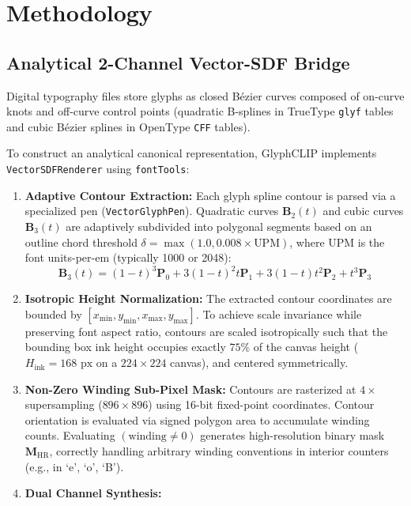 \documentclass[10pt,twocolumn,letterpaper]{article}
\begin{document}
\section{Methodology}

\subsection{Analytical 2-Channel Vector-SDF Bridge}
Digital typography files store glyphs as closed Bézier curves composed of on-curve knots and off-curve control points (quadratic B-splines in TrueType \texttt{glyf} tables and cubic Bézier splines in OpenType \texttt{CFF} tables).

To construct an analytical canonical representation, GlyphCLIP implements \texttt{VectorSDFRenderer} using \texttt{fontTools}:
\begin{enumerate}
    \item \textbf{Adaptive Contour Extraction:} Each glyph spline contour is parsed via a specialized pen (\texttt{VectorGlyphPen}). Quadratic curves $\mathbf{B}_2(t)$ and cubic curves $\mathbf{B}_3(t)$ are adaptively subdivided into polygonal segments based on an outline chord threshold $\delta = \max(1.0, 0.008 \times \text{UPM})$, where $\text{UPM}$ is the font units-per-em (typically 1000 or 2048):
    \begin{equation}
        \mathbf{B}_3(t) = (1-t)^3 \mathbf{P}_0 + 3(1-t)^2 t \mathbf{P}_1 + 3(1-t)t^2 \mathbf{P}_2 + t^3 \mathbf{P}_3
    \end{equation}
    \item \textbf{Isotropic Height Normalization:} The extracted contour coordinates are bounded by $[x_{\min}, y_{\min}, x_{\max}, y_{\max}]$. To achieve scale invariance while preserving font aspect ratio, contours are scaled isotropically such that the bounding box ink height occupies exactly $75\%$ of the canvas height ($H_{\text{ink}} = 168\text{ px}$ on a $224 \times 224$ canvas), and centered symmetrically.
    \item \textbf{Non-Zero Winding Sub-Pixel Mask:} Contours are rasterized at $4\times$ supersampling ($896 \times 896$) using 16-bit fixed-point coordinates. Contour orientation is evaluated via signed polygon area to accumulate winding counts. Evaluating $(\text{winding} \neq 0)$ generates high-resolution binary mask $\mathbf{M}_{\text{HR}}$, correctly handling arbitrary winding conventions in interior counters (e.g., in `e', `o', `B').
    \item \textbf{Dual Channel Synthesis:}

\end{enumerate}
\end{document}

